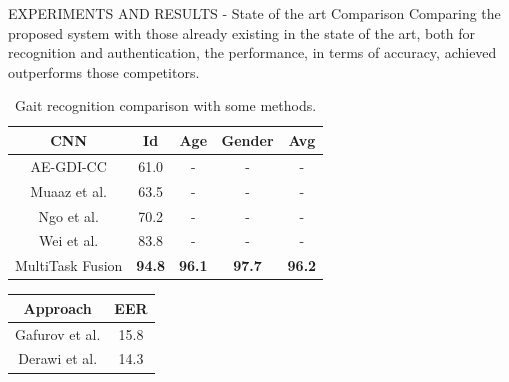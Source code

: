 \begin{frame}{EXPERIMENTS AND RESULTS - State of the art Comparison}
    Comparing the proposed system with those already existing in the state 
    of the art, both for recognition and authentication, the performance, in 
    terms of accuracy, achieved outperforms those competitors.
        \begin{minipage}{\linewidth}
        \centering
        \begin{minipage}{0.45\linewidth}
            \begin{table}[h!]
                \centering
                \begin{adjustbox}{max width=\textwidth}
                \begin{tabular}{|c|ccc|c|}
                    \hline
                    CNN & Id & Age & Gender & Avg\\
                    \hline
                    AE-GDI-CC & 61.0 & - & - & -\\
                    Muaaz et al. & 63.5 & - & - & -\\
                    Ngo et al. & 70.2 & - & - & -\\
                    Wei et al. & 83.8 & - & - & - \\
                    \hline
                    MultiTask Fusion & \bfseries{94.8} & \bfseries{96.1} & \bfseries{97.7} & \bfseries{96.2}\\
                    \hline
                \end{tabular}
                \end{adjustbox}
                \caption{Gait recognition comparison with some methods.}
                \label{Gait comparison}
            \end{table}
        \end{minipage}
        \hspace{0.05\linewidth}
        \begin{minipage}{0.45\linewidth}
            \begin{table}[h!]
                \centering
                \begin{adjustbox}{max width=\textwidth}
                \begin{tabular}{|c|c|}
                    \hline
                    Approach & EER\\
                    \hline
                    Gafurov et al. & 15.8 \\
                    Derawi et al. & 14.3 \\

\end{tabular}
\end{adjustbox}
\end{table}
\end{minipage}
\end{minipage}
\end{frame}

